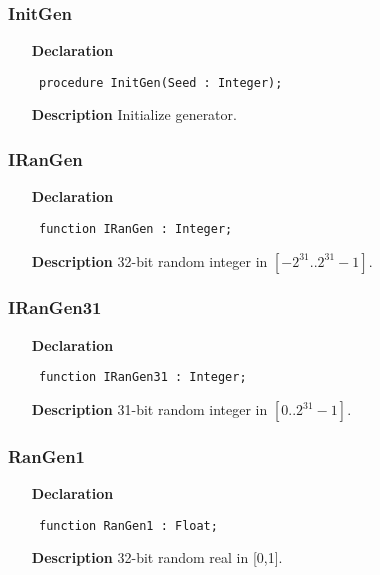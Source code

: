 \documentclass[12pt,a4paper,oneside]{report}
\newcommand{\declarationitem}[1]{\textbf{#1}}
\newcommand{\descriptiontitle}[1]{\textbf{#1}}
\newcommand{\code}[1]{\texttt{#1}}
\begin{document}
\subsubsection{InitGen}
\label{urandom-InitGen}
\begin{itemize}\item[\declarationitem{Declaration}\hfill]
	\begin{flushleft}
		\code{
			procedure InitGen(Seed : Integer);}
	\end{flushleft}
	\item[\descriptiontitle{Description}]
	Initialize generator.
\end{itemize}
\subsubsection{IRanGen}
\label{urandom-IRanGen}
\begin{itemize}\item[\declarationitem{Declaration}\hfill]
	\begin{flushleft}
		\code{
			function IRanGen : Integer;}
	\end{flushleft}
	\par
	\item[\descriptiontitle{Description}]
	32{-}bit random integer in $[-2^{31}..2^{31}-1]$.
\end{itemize}
\subsubsection{IRanGen31}
\label{urandom-IRanGen31}
\begin{itemize}\item[\declarationitem{Declaration}\hfill]
	\begin{flushleft}
		\code{
			function IRanGen31 : Integer;}
		
	\end{flushleft}
	
	\par
	\item[\descriptiontitle{Description}]
	31-bit random integer in $[0..2^{31}-1]$.
	
\end{itemize}
\subsubsection{RanGen1}
\label{urandom-RanGen1}
\begin{itemize}\item[\declarationitem{Declaration}\hfill]
	\begin{flushleft}
		\code{
			function RanGen1 : Float;}
		
	\end{flushleft}
	
	\par
	\item[\descriptiontitle{Description}]
	32-bit random real in [0,1].
	
\end{itemize}
\end{document}
